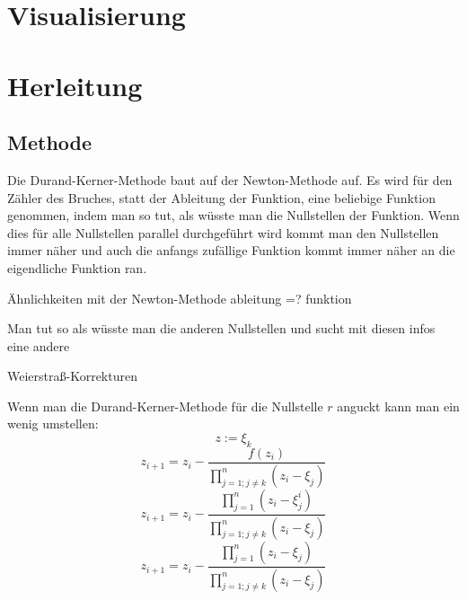 \documentclass[12pt]{article}
\begin{document}
\section{Visualisierung}

\section{Herleitung}
\subsection{Methode}
Die Durand-Kerner-Methode baut auf der Newton-Methode auf. Es wird für den Zähler des Bruches, statt der Ableitung der Funktion, eine beliebige Funktion genommen, indem man so tut, als wüsste man die Nullstellen der Funktion. Wenn dies für alle Nullstellen parallel durchgeführt wird kommt man den Nullstellen immer näher und auch die anfangs zufällige Funktion kommt immer näher an die eigendliche Funktion ran.

Ähnlichkeiten mit der Newton-Methode
ableitung =? funktion

Man tut so als wüsste man die anderen Nullstellen und sucht mit diesen infos eine andere

Weierstraß-Korrekturen

Wenn man die Durand-Kerner-Methode für die Nullstelle $r$ anguckt kann man ein wenig umstellen:
\begin{displaymath}
    z := \xi_k
\end{displaymath}
\begin{displaymath}
    z_{i+1} = z_i - \frac{f(z_i)}{\prod_{j=1;j\neq k}^n (z_i-\xi_j)}
\end{displaymath}
\begin{displaymath}
    z_{i+1} = z_i - \frac{\prod_{j=1}^n (z_i-\xi_j^i)}{\prod_{j=1;j\neq k}^n (z_i-\xi_j)}
\end{displaymath}
\begin{displaymath}
    z_{i+1} = z_i - \frac{\prod_{j=1}^n (z_i-\xi_j)}{\prod_{j=1;j\neq k}^n (z_i-\xi_j)}
\end{displaymath}
\end{document}
